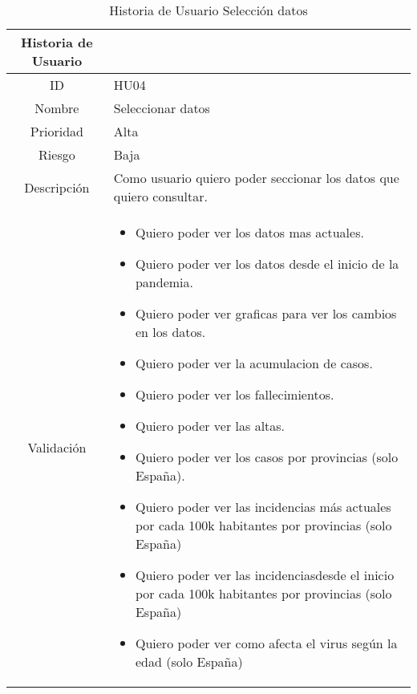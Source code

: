 \begin{table}[h]
	\begin{center}
		\begin{tabular}{| c | p{9cm} |}
			\hline
			
			Historia de Usuario &  \\ \hline
			
			
			ID & HU04 \\
			Nombre & Seleccionar datos \\
			Prioridad & Alta \\
			Riesgo & Baja \\
			Descripción & Como usuario quiero poder seccionar los datos que quiero consultar. \\
			Validación & \begin{itemize}
				\item Quiero poder ver los datos mas actuales.
				\item Quiero poder ver los datos desde el inicio de la pandemia.
				\item Quiero poder ver graficas para ver los cambios en los datos.
				\item Quiero poder ver la acumulacion de casos.
				\item Quiero poder ver los fallecimientos.
				\item Quiero poder ver las altas.
				\item Quiero poder ver los casos por provincias (solo España).
				\item Quiero poder ver las incidencias más actuales por cada 100k habitantes por provincias (solo España)
				\item Quiero poder ver las incidenciasdesde el inicio por cada 100k habitantes por provincias (solo España)
				\item Quiero poder ver como afecta el virus según la edad (solo España)
				
			\end{itemize} \\ \hline
		\end{tabular}
		\caption{Historia de Usuario Selección datos}
		\label{tab:historia-usuario-04}
	\end{center}
\end{table}

